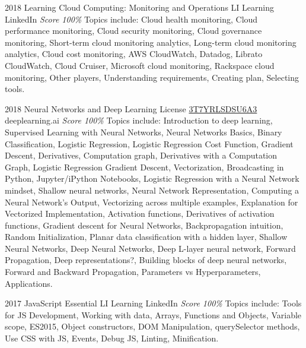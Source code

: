\documentclass[11pt,a4paper]{moderncv}
\begin{document}
\cventry
    {2018}
    {Learning Cloud Computing: Monitoring and Operations}
    {LI Learning}
    {LinkedIn}
    {\textit{Score 100\%}}
    {
        Topics include:
            Cloud health monitoring,
            Cloud performance monitoring,
            Cloud security monitoring,
            Cloud governance monitoring,
            Short-term cloud monitoring analytics,
            Long-term cloud monitoring analytics,
            Cloud cost monitoring,
            AWS CloudWatch,
            Datadog,
            Librato CloudWatch,
            Cloud Cruiser,
            Microsoft cloud monitoring,
            Rackspace cloud monitoring,
            Other players,
            Understanding requirements,
            Creating plan,
            Selecting tools.
    }

\cventry
    {2018}
    {Neural Networks and Deep Learning}
    {License
        \href{https://www.coursera.org/account/accomplishments/records/T7YRLSDSU6A}
        {3T7YRLSDSU6A3}
    }
    {deeplearning.ai}
    {\textit{Score 100\%}}
    {
        Topics include:
            Introduction to deep learning,
            Supervised Learning with Neural Networks,
            Neural Networks Basics,
            Binary Classification,
            Logistic Regression,
            Logistic Regression Cost Function,
            Gradient Descent,
            Derivatives,
            Computation graph,
            Derivatives with a Computation Graph,
            Logistic Regression Gradient Descent,
            Vectorization,
            Broadcasting in Python,
            Jupyter/iPython Notebooks,
            Logistic Regression with a Neural Network mindset,
            Shallow neural networks,
            Neural Network Representation,
            Computing a Neural Network's Output,
            Vectorizing across multiple examples,
            Explanation for Vectorized Implementation,
            Activation functions,
            Derivatives of activation functions,
            Gradient descent for Neural Networks,
            Backpropagation intuition,
            Random Initialization,
            Planar data classification with a hidden layer,
            Shallow Neural Networks,
            Deep Neural Networks,
            Deep L-layer neural network,
            Forward Propagation,
            Deep representations?,
            Building blocks of deep neural networks,
            Forward and Backward Propagation,
            Parameters vs Hyperparameters,
            Applications.
    }

\cventry
    {2017}
    {JavaScript Essential}
    {LI Learning}
    {LinkedIn}
    {\textit{Score 100\%}}
    {
        Topics include:
            Tools for JS Development,
            Working with data,
            Arrays,
            Functions and Objects,
            Variable scope,
            ES2015,
            Object constructors,
            DOM Manipulation,
            querySelector methods,
            Use CSS with JS,
            Events,
            Debug JS,
            Linting,
            Minification.
    }
\end{document}
